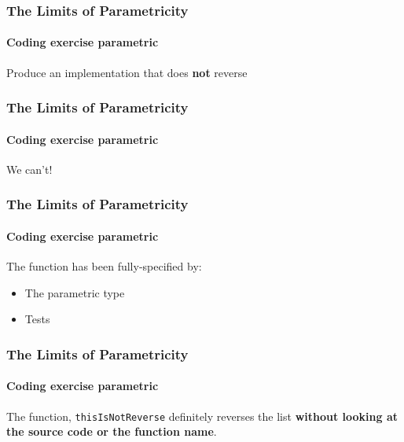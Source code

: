 \begin{frame}[fragile]
\frametitle{The Limits of Parametricity}
\framesubtitle{Coding exercise \textemdash parametric}
\begin{block}{Produce an implementation that does \textbf{not} reverse}

\end{block}
\end{frame}

\begin{frame}[fragile]
\frametitle{The Limits of Parametricity}
\framesubtitle{Coding exercise \textemdash parametric}
\begin{center}
We can't!
\end{center}
\end{frame}

\begin{frame}[fragile]
\frametitle{The Limits of Parametricity}
\framesubtitle{Coding exercise \textemdash parametric}
\begin{block}{The function has been fully-specified by:}
\begin{itemize}
  \item The parametric type
  \item Tests
\end{itemize}
\end{block}
\end{frame}

\begin{frame}[fragile]
\frametitle{The Limits of Parametricity}
\framesubtitle{Coding exercise \textemdash parametric}
\begin{center}
The function, \lstinline{thisIsNotReverse} definitely reverses the list \textbf{without looking at the source code or the function name}.
\end{center}
\end{frame}